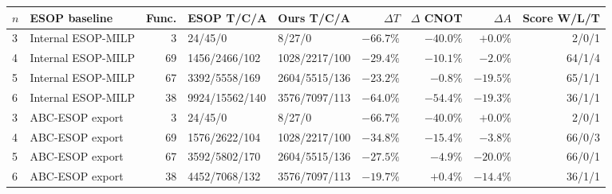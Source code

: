 \begin{tabular}{@{}llrllrrrr@{}}
\toprule
$n$ & ESOP baseline & Func. & ESOP T/C/A & Ours T/C/A & $\Delta T$ & $\Delta$ CNOT & $\Delta A$ & Score W/L/T \\
\midrule
3 & Internal ESOP\mbox{-}MILP & 3 & 24/45/0 & 8/27/0 & $-66.7\%$ & $-40.0\%$ & $+0.0\%$ & 2/0/1 \\
4 & Internal ESOP\mbox{-}MILP & 69 & 1456/2466/102 & 1028/2217/100 & $-29.4\%$ & $-10.1\%$ & $-2.0\%$ & 64/1/4 \\
5 & Internal ESOP\mbox{-}MILP & 67 & 3392/5558/169 & 2604/5515/136 & $-23.2\%$ & $-0.8\%$ & $-19.5\%$ & 65/1/1 \\
6 & Internal ESOP\mbox{-}MILP & 38 & 9924/15562/140 & 3576/7097/113 & $-64.0\%$ & $-54.4\%$ & $-19.3\%$ & 36/1/1 \\
3 & ABC\mbox{-}ESOP export & 3 & 24/45/0 & 8/27/0 & $-66.7\%$ & $-40.0\%$ & $+0.0\%$ & 2/0/1 \\
4 & ABC\mbox{-}ESOP export & 69 & 1576/2622/104 & 1028/2217/100 & $-34.8\%$ & $-15.4\%$ & $-3.8\%$ & 66/0/3 \\
5 & ABC\mbox{-}ESOP export & 67 & 3592/5802/170 & 2604/5515/136 & $-27.5\%$ & $-4.9\%$ & $-20.0\%$ & 66/0/1 \\
6 & ABC\mbox{-}ESOP export & 38 & 4452/7068/132 & 3576/7097/113 & $-19.7\%$ & $+0.4\%$ & $-14.4\%$ & 36/1/1 \\
\bottomrule
\end{tabular}
